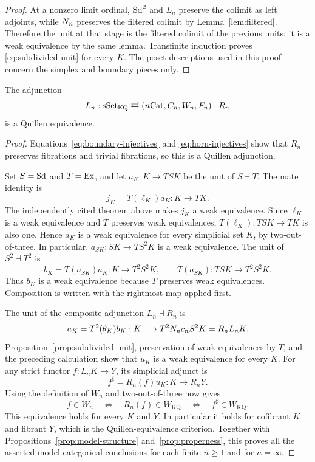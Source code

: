 \begin{proof}
At a nonzero limit ordinal, $\mathrm{Sd}^2$ and $L_n$ preserve the
colimit as left adjoints, while $N_n$ preserves the filtered
colimit by Lemma~\ref{lem:filtered}.  Therefore the unit at that
stage is the filtered colimit of the previous units; it is a weak
equivalence by the same lemma.  Transfinite induction proves
\eqref{eq:subdivided-unit} for every $K$.  The poset descriptions
used in this proof concern the simplex and boundary pieces only.
\end{proof}

\begin{theorem}\label{thm:quillen-equivalence}
The adjunction
\[
 L_n:\mathrm{sSet}_{\mathrm{KQ}}\rightleftarrows
       (n\mathrm{Cat},C_n,W_n,F_n):R_n
\]
is a Quillen equivalence.
\end{theorem}

\begin{proof}
Equations~\eqref{eq:boundary-injectives} and
\eqref{eq:horn-injectives} show that $R_n$ preserves fibrations
and trivial fibrations, so this is a Quillen adjunction.

Set $S=\mathrm{Sd}$ and $T=\mathrm{Ex}$, and let $a_K:K\to TSK$ be the unit of
$S\dashv T$. The mate identity is
\[
 j_K=T(\ell_K)a_K:K\longrightarrow TK.
\]
The independently cited theorem above makes $j_K$ a weak equivalence.
Since $\ell_K$ is a weak equivalence and $T$ preserves weak
equivalences, $T(\ell_K):TSK\to TK$ is also one. Hence $a_K$ is a
weak equivalence for every simplicial set $K$, by two-out-of-three.
In particular, $a_{SK}:SK\to TS^2K$ is a weak equivalence. The unit
of $S^2\dashv T^2$ is
\[
 b_K=T(a_{SK})a_K:K\longrightarrow T^2S^2K,
 \qquad T(a_{SK}):TSK\longrightarrow T^2S^2K.
\]
Thus $b_K$ is a weak equivalence because $T$ preserves weak equivalences.
Composition is written with the rightmost map applied first.

The unit of the composite adjunction $L_n\dashv R_n$ is
\[
 u_K=T^2(\theta_K)b_K:
       K\longrightarrow T^2N_n c_nS^2K=R_nL_nK.
\]
Proposition~\ref{prop:subdivided-unit}, preservation of weak
equivalences by $T$, and the preceding calculation show that
$u_K$ is a weak equivalence for every $K$.
For any strict functor $f:L_nK\to Y$, its simplicial adjunct is
\[
 f^\sharp=R_n(f)u_K:K\longrightarrow R_nY.
\]
Using the definition of $W_n$ and two-out-of-three now gives
\[
 f\in W_n
 \quad\Longleftrightarrow\quad
 R_n(f)\in W_{\mathrm{KQ}}
 \quad\Longleftrightarrow\quad
 f^\sharp\in W_{\mathrm{KQ}}.
\]
This equivalence holds for every $K$ and $Y$.  In particular it
holds for cofibrant $K$ and fibrant $Y$, which is the
Quillen-equivalence criterion.  Together with
Propositions~\ref{prop:model-structure} and~\ref{prop:properness},
this proves all the asserted model-categorical conclusions for
each finite $n\geq1$ and for $n=\infty$.
\end{proof}
